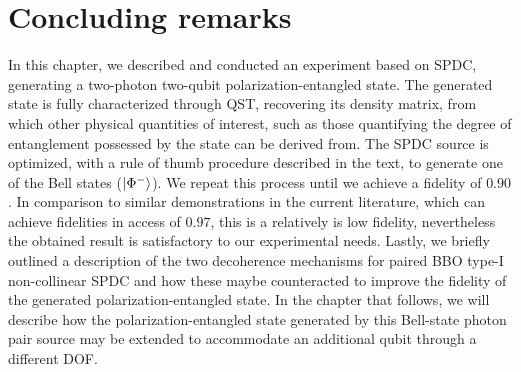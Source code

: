 \section{Concluding remarks}
In this chapter, we described and conducted an experiment based on \acs{SPDC}, generating a two-photon two-qubit polarization-entangled state. The generated state is fully characterized through \acs{QST}, recovering its density matrix, from which other physical quantities of interest, such as those quantifying the degree of entanglement possessed by the state can be derived from. The \acs{SPDC} source is optimized, with a rule of thumb procedure described in the text, to generate one of the Bell states ($\ket{\Phi^{-}}$). We repeat this process until we achieve a fidelity of $0.90$. In comparison to similar demonstrations in the current literature, which can achieve fidelities in access of $0.97$, this is a relatively is low fidelity, nevertheless the obtained result is satisfactory to our experimental needs. Lastly, we briefly outlined a description of the two decoherence mechanisms for paired \acs{BBO} type-I non-collinear \acs{SPDC} and how these maybe counteracted to improve the fidelity of the generated polarization-entangled state. In the chapter that follows, we will describe how the polarization-entangled state generated by this Bell-state photon pair source may be extended to accommodate an additional qubit through a different \acs{DOF}.
